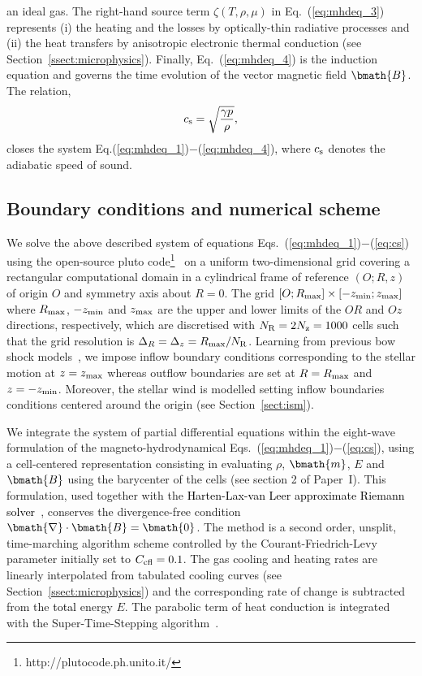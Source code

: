 \documentclass[useAMS,usenatbib]{mn2e}
\begin{document}
an ideal gas. The right-hand source term $\zeta(T,\rho,\mu)$ in
Eq.~(\ref{eq:mhdeq_3}) represents (i) the heating and the losses by
optically-thin radiative processes and (ii) the heat transfers by anisotropic
electronic thermal conduction (see Section~\ref{ssect:microphysics}). Finally,
Eq.~(\ref{eq:mhdeq_4}) is the induction equation and governs the time evolution
of the vector magnetic field $\bmath{B}$. The relation, 
%
\begin{equation}
	  c_{\rm s} = \sqrt{ \frac{\gamma p}{\rho} },
\label{eq:cs}
\end{equation}
%
closes the system Eq.(\ref{eq:mhdeq_1})$-$(\ref{eq:mhdeq_4}), where $c_{\rm
s}$ denotes the adiabatic speed of sound. 


\subsection{Boundary conditions and numerical scheme}
\label{sect:scheme}


We solve the above described system of equations
Eqs.~(\ref{eq:mhdeq_1})$-$(\ref{eq:cs}) using the open-source {\sc pluto}
code\footnote{http://plutocode.ph.unito.it/}~\citep{mignone_apj_170_2007,
migmone_apjs_198_2012} on a uniform two-dimensional grid covering a rectangular
computational domain in a cylindrical frame of reference $(O; R, z)$ of origin
$O$ and symmetry axis about $R=0$. The grid $[O;R_{\rm max}]\times[-z_{\rm
min};z_{\rm max}]$ where $R_{\rm max}$, $-z_{\rm min}$ and $z_{\rm max}$ are the
upper and lower limits of the $OR$ and $Oz$ directions, respectively, which are
discretised with $N_{\rm R}=2N_{\rm z}=1000$ cells such that the grid resolution
is $\Delta_R=\Delta_z=R_{\rm max}/N_{\rm R}$. Learning from previous bow shock
models~\citep{comeron_aa_338_1998,vanmarle_aa_460_2006}, we impose inflow
boundary conditions corresponding to the stellar motion at $z=z_{\rm max}$
whereas outflow boundaries are set at $R=R_{\rm max}$ and $z=-z_{\rm min}$.
Moreover, the stellar wind is modelled setting inflow boundaries conditions
centered around the origin (see Section~\ref{sect:ism}). 


We integrate the system of partial differential equations within the eight-wave
formulation of the magneto-hydrodynamical Eqs.~(\ref{eq:mhdeq_1})$-$(\ref{eq:cs}),
using a cell-centered representation consisting in evaluating $\rho$,
$\bmath{m}$, $E$ and $\bmath{B}$ using the barycenter of the cells (see
section 2 of Paper~I). This formulation, used together with the \textcolor{black}{Harten-Lax-van
Leer approximate Riemann solver~\citep{hll_ref}}, conserves the divergence-free condition
$\bmath{\nabla} \cdot \bmath{B} = \bmath{0}$. The method is a second order,
unsplit, time-marching algorithm scheme controlled by the Courant-Friedrich-Levy
parameter initially set to $C_{\rm cfl}=0.1$. The gas cooling and heating
rates are linearly interpolated from tabulated cooling curves (see
Section~\ref{ssect:microphysics}) and the corresponding rate of change is 
subtracted from the \textcolor{black}{total} energy $E$. The parabolic term of
heat conduction is integrated with the Super-Time-Stepping
algorithm~\citep{alexiades_cnme_12_1996}. 
\end{document}
